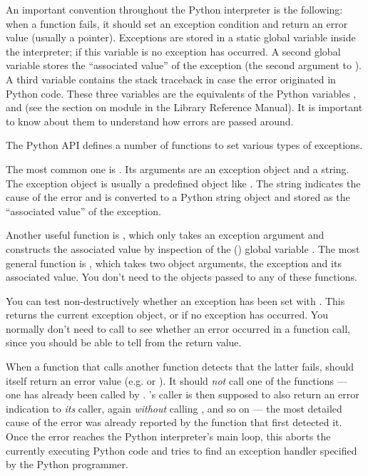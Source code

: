 \documentclass[twoside,openright]{report}
\begin{document}
An important convention throughout the Python interpreter is the
following: when a function fails, it should set an exception condition
and return an error value (usually a \NULL{} pointer).  Exceptions
are stored in a static global variable inside the interpreter; if this
variable is \NULL{} no exception has occurred.  A second global
variable stores the ``associated value'' of the exception (the second
argument to ).  A third variable contains the stack
traceback in case the error originated in Python code.  These three
variables are the \C{} equivalents of the Python variables
,  and 
(see the section on module  in the Library Reference
Manual).  It is important to know about them to understand how errors
are passed around.

The Python API defines a number of functions to set various types of
exceptions.

The most common one is .  Its arguments are an
exception object and a \C{} string.  The exception object is usually a
predefined object like .  The \C{} string
indicates the cause of the error and is converted to a Python string
object and stored as the ``associated value'' of the exception.

Another useful function is , which only
takes an exception argument and constructs the associated value by
inspection of the (\UNIX{}) global variable .  The most
general function is , which takes two object
arguments, the exception and its associated value.  You don't need to
 the objects passed to any of these functions.

You can test non-destructively whether an exception has been set with
.  This returns the current exception object,
or \NULL{} if no exception has occurred.  You normally don't need
to call  to see whether an error occurred in a
function call, since you should be able to tell from the return value.

When a function  that calls another function  detects
that the latter fails,  should itself return an error value
(e.g. \NULL{} or ).  It should \emph{not} call one of the
 functions --- one has already been called by .
's caller is then supposed to also return an error indication
to \emph{its} caller, again \emph{without} calling ,
and so on --- the most detailed cause of the error was already
reported by the function that first detected it.  Once the error
reaches the Python interpreter's main loop, this aborts the currently
executing Python code and tries to find an exception handler specified
by the Python programmer.
\end{document}
